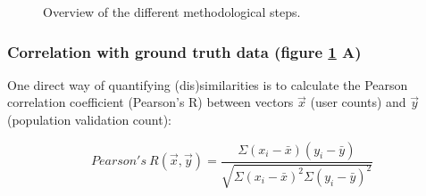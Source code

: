 \documentclass[a4paper]{article}
\begin{document}
\begin{figure}[htbp!]
\centering
\caption{Overview of the different methodological steps.}
\label{fig:overzicht}
\end{figure}


\subsubsection{Correlation with ground truth data (figure \ref{fig:overzicht} A) }\label{sect.pearson_definition}

One direct way of quantifying (dis)similarities is to calculate the Pearson correlation coefficient (Pearson's R) between vectors $\vec{x}$ (user counts) and $\vec{y}$ (population validation count):

\begin{equation}
Pearson's\:R (\vec{x},\vec{y})=\frac{\Sigma(x_i - \bar{x})(y_i - \bar{y})}{\sqrt{\Sigma(x_i - \bar{x})^2\Sigma(y_i - \bar{y})^2}}
\end{equation}
\end{document}
